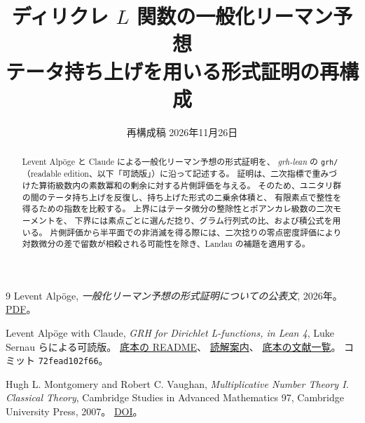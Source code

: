 \documentclass[a4paper,11pt]{ltjsarticle}
\title{ディリクレ \(L\) 関数の一般化リーマン予想\\[0.45em]
  \large テータ持ち上げを用いる形式証明の再構成}
\author{}
\date{\small 再構成稿 \quad 2026年11月26日}
\theoremstyle{plain}
\theoremstyle{definition}
\numberwithin{equation}{section}
\begin{document}
\maketitle

\begin{abstract}
Levent Alpöge と Claude による一般化リーマン予想の形式証明を、
\emph{grh-lean} の \texttt{grh/}（readable edition、以下「可読版」）に沿って記述する。
証明は、二次指標で重みづけた算術級数内の素数冪和の剰余に対する片側評価を与える。
そのため、ユニタリ群の間のテータ持ち上げを反復し、持ち上げた形式の二乗余体積と、
有限素点で整性を得るための指数を比較する。
上界にはテータ微分の整除性とポアンカレ級数の二次モーメントを、
下界には素点ごとに選んだ捻り、グラム行列式の比、および積公式を用いる。
片側評価から半平面での非消滅を得る際には、二次捻りの零点密度評価により
対数微分の差で留数が相殺される可能性を除き、Landau の補題を適用する。
\end{abstract}











\begin{thebibliography}{9}
Levent Alpöge,
\emph{一般化リーマン予想の形式証明についての公表文},
2026年。
\href{https://alpo.ge/remark.pdf}{PDF}。

Levent Alpöge with Claude, \emph{GRH for Dirichlet L-functions, in Lean 4},
Luke Sernau らによる可読版。
\href{\upstream/grh/README.md}{底本の README}、
\href{\upstream/grh/GUIDE.md}{読解案内}、
\href{\upstream/grh/REFERENCES.md}{底本の文献一覧}。
コミット \texttt{72fead102f66}。

Hugh L. Montgomery and Robert C. Vaughan,
\emph{Multiplicative Number Theory I. Classical Theory},
Cambridge Studies in Advanced Mathematics 97,
Cambridge University Press, 2007。
\href{https://doi.org/10.1017/CBO9780511618314}{DOI}。

\end{thebibliography}


\end{document}
